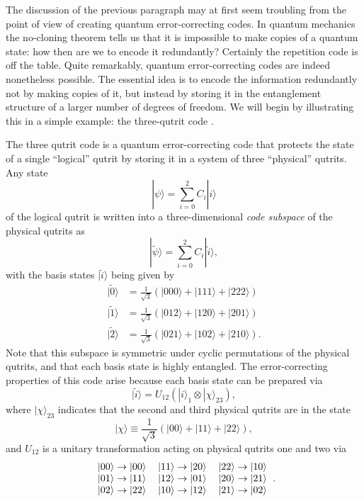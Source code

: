 \documentclass[toc]{PoS}
\newcommand{\be}{\begin{equation}}
\newcommand{\ee}{\end{equation}}
\newcommand{\ran}{\rangle}
\newcommand{\wt}{\widetilde}
\begin{document}
The discussion of the previous paragraph may at first seem troubling from the point of view of creating quantum error-correcting codes.  In quantum mechanics the no-cloning theorem tells us that it is impossible to make copies of a quantum state: how then are we to encode it redundantly?  Certainly the repetition code is off the table.  Quite remarkably, quantum error-correcting codes are indeed nonetheless possible.  The essential idea is to encode the information redundantly not by making copies of it, but instead by storing it in the entanglement structure of a larger number of degrees of freedom.  We will begin by illustrating this in a simple example: the three-qutrit code \cite{Cleve:1999qg}.

The three qutrit code is a quantum error-correcting code that protects the state of a single ``logical'' qutrit by storing it in a system of three ``physical''  qutrits.  Any state
\be
|\psi\ran=\sum_{i=0}^2 C_i |i\ran
\ee
of the logical qutrit is written into a three-dimensional \textit{code subspace} of the physical qutrits as
\be
|\wt{\psi}\ran=\sum_{i=0}^2 C_i |\wt{i}\ran,
\ee
with the basis states $|\wt{i}\ran$ being given by
\begin{align}\nonumber
|\wt{0}\ran&=\frac{1}{\sqrt{3}}\left(|000\ran+|111\ran+|222\ran\right)\\\nonumber
|\wt{1}\ran&=\frac{1}{\sqrt{3}}\left(|012\ran+|120\ran+|201\ran\right)\\
|\wt{2}\ran&=\frac{1}{\sqrt{3}}\left(|021\ran+|102\ran+|210\ran\right).\label{3qutrit}
\end{align}
Note that this subspace is symmetric under cyclic permutations of the physical qutrits, and that each basis state is highly entangled.  The error-correcting properties of this code arise because each basis state can be prepared via
\be\label{encode30}
|\wt{i}\ran=U_{12}\left(|i\ran_1\otimes |\chi\ran_{23}\right),
\ee
where $|\chi\ran_{23}$ indicates that the second and third physical qutrits are in the state
\be\label{chidef}
|\chi\ran\equiv \frac{1}{\sqrt{3}}\left(|00\ran+|11\ran+|22\ran\right),
\ee
and $U_{12}$ is a unitary transformation acting on physical qutrits one and two via
\begin{align}
\begin{tabular}{ l c r }
$|00\ran\to|00\ran$ & $|11\ran \to |20\ran$ & $|22\ran\to |10\ran$ \\
$|01\ran \to |11\ran$ & $|12\ran \to |01\ran$ & $|20\ran \to |21\ran$ \\
$|02\ran\to |22\ran$ & $|10\ran\to|12\ran$ & $|21\ran \to |02\ran$ \\
\end{tabular}.
\end{align}
\end{document}
